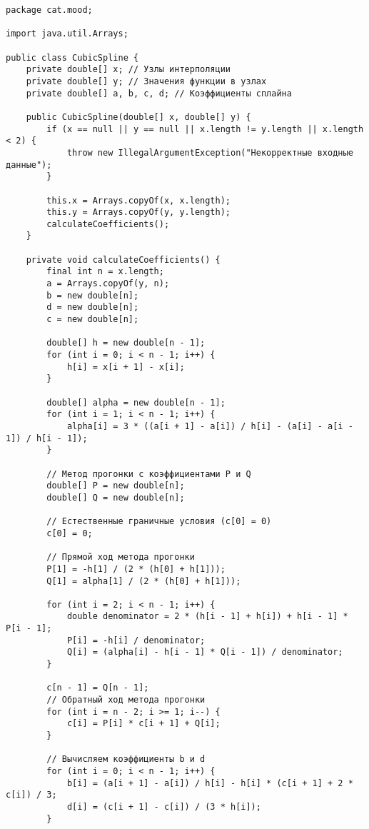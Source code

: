 \begin{verbatim}
package cat.mood;

import java.util.Arrays;

public class CubicSpline {
    private double[] x; // Узлы интерполяции
    private double[] y; // Значения функции в узлах
    private double[] a, b, c, d; // Коэффициенты сплайна

    public CubicSpline(double[] x, double[] y) {
        if (x == null || y == null || x.length != y.length || x.length < 2) {
            throw new IllegalArgumentException("Некорректные входные данные");
        }

        this.x = Arrays.copyOf(x, x.length);
        this.y = Arrays.copyOf(y, y.length);
        calculateCoefficients();
    }

    private void calculateCoefficients() {
        final int n = x.length;
        a = Arrays.copyOf(y, n);
        b = new double[n];
        d = new double[n];
        c = new double[n];

        double[] h = new double[n - 1];
        for (int i = 0; i < n - 1; i++) {
            h[i] = x[i + 1] - x[i];
        }

        double[] alpha = new double[n - 1];
        for (int i = 1; i < n - 1; i++) {
            alpha[i] = 3 * ((a[i + 1] - a[i]) / h[i] - (a[i] - a[i - 1]) / h[i - 1]);
        }

        // Метод прогонки с коэффициентами P и Q
        double[] P = new double[n];
        double[] Q = new double[n];

        // Естественные граничные условия (c[0] = 0)
        c[0] = 0;

        // Прямой ход метода прогонки
        P[1] = -h[1] / (2 * (h[0] + h[1]));
        Q[1] = alpha[1] / (2 * (h[0] + h[1]));

        for (int i = 2; i < n - 1; i++) {
            double denominator = 2 * (h[i - 1] + h[i]) + h[i - 1] * P[i - 1];
            P[i] = -h[i] / denominator;
            Q[i] = (alpha[i] - h[i - 1] * Q[i - 1]) / denominator;
        }

        c[n - 1] = Q[n - 1];
        // Обратный ход метода прогонки
        for (int i = n - 2; i >= 1; i--) {
            c[i] = P[i] * c[i + 1] + Q[i];
        }

        // Вычисляем коэффициенты b и d
        for (int i = 0; i < n - 1; i++) {
            b[i] = (a[i + 1] - a[i]) / h[i] - h[i] * (c[i + 1] + 2 * c[i]) / 3;
            d[i] = (c[i + 1] - c[i]) / (3 * h[i]);
        }


\end{verbatim}
